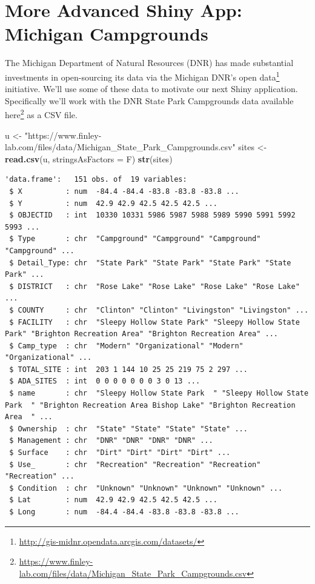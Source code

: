 \documentclass[
]{krantz}
\makeatletter
\newenvironment{Shaded}{\begin{snugshade}}{\end{snugshade}}
\newcommand{\DataTypeTok}[1]{\textcolor[rgb]{0.27,0.27,0.27}{#1}}
\newcommand{\KeywordTok}[1]{\textcolor[rgb]{0.27,0.27,0.27}{\textbf{#1}}}
\newcommand{\NormalTok}[1]{#1}
\newcommand{\StringTok}[1]{\textcolor[rgb]{0.5,0.5,0.5}{#1}}
\renewcommand{\href}[2]{#2\footnote{\url{#1}}}
\newenvironment{kframe}{%
\medskip{}
\setlength{\fboxsep}{.8em}
 \def\at@end@of@kframe{}%
 \ifinner\ifhmode%
  \def\at@end@of@kframe{\end{minipage}}%
  \begin{minipage}{\columnwidth}%
 \fi\fi%
 \def\FrameCommand##1{\hskip\@totalleftmargin \hskip-\fboxsep
 \colorbox{shadecolor}{##1}\hskip-\fboxsep
     \hskip-\linewidth \hskip-\@totalleftmargin \hskip\columnwidth}%
 \MakeFramed {\advance\hsize-\width
   \@totalleftmargin\z@ \linewidth\hsize
   \@setminipage}}%
 {\par\unskip\endMakeFramed%
 \at@end@of@kframe}
\renewenvironment{Shaded}{\begin{kframe}}{\end{kframe}}
\makeatother
\begin{document}
\hypertarget{more-advanced-shiny-app-michigan-campgrounds}{%
\section{More Advanced Shiny App: Michigan Campgrounds}\label{more-advanced-shiny-app-michigan-campgrounds}}

The Michigan Department of Natural Resources (DNR) has made substantial investments in open-sourcing its data via the \href{http://gis-midnr.opendata.arcgis.com/datasets/}{Michigan DNR's open data} initiative. We'll use some of these data to motivate our next Shiny application. Specifically we'll work with the DNR State Park Campgrounds data available \href{https://www.finley-lab.com/files/data/Michigan_State_Park_Campgrounds.csv}{here} as a CSV file.

\begin{Shaded}
\begin{Highlighting}[]
\NormalTok{u \textless{}{-}}\StringTok{ "https://www.finley{-}lab.com/files/data/Michigan\_State\_Park\_Campgrounds.csv"}
\NormalTok{sites \textless{}{-}}\StringTok{ }\KeywordTok{read.csv}\NormalTok{(u, }\DataTypeTok{stringsAsFactors =}\NormalTok{ F)}
\KeywordTok{str}\NormalTok{(sites)}
\end{Highlighting}
\end{Shaded}

\begin{verbatim}
'data.frame':	151 obs. of  19 variables:
 $ X          : num  -84.4 -84.4 -83.8 -83.8 -83.8 ...
 $ Y          : num  42.9 42.9 42.5 42.5 42.5 ...
 $ OBJECTID   : int  10330 10331 5986 5987 5988 5989 5990 5991 5992 5993 ...
 $ Type       : chr  "Campground" "Campground" "Campground" "Campground" ...
 $ Detail_Type: chr  "State Park" "State Park" "State Park" "State Park" ...
 $ DISTRICT   : chr  "Rose Lake" "Rose Lake" "Rose Lake" "Rose Lake" ...
 $ COUNTY     : chr  "Clinton" "Clinton" "Livingston" "Livingston" ...
 $ FACILITY   : chr  "Sleepy Hollow State Park" "Sleepy Hollow State Park" "Brighton Recreation Area" "Brighton Recreation Area" ...
 $ Camp_type  : chr  "Modern" "Organizational" "Modern" "Organizational" ...
 $ TOTAL_SITE : int  203 1 144 10 25 25 219 75 2 297 ...
 $ ADA_SITES  : int  0 0 0 0 0 0 0 3 0 13 ...
 $ name       : chr  "Sleepy Hollow State Park  " "Sleepy Hollow State Park  " "Brighton Recreation Area Bishop Lake" "Brighton Recreation Area  " ...
 $ Ownership  : chr  "State" "State" "State" "State" ...
 $ Management : chr  "DNR" "DNR" "DNR" "DNR" ...
 $ Surface    : chr  "Dirt" "Dirt" "Dirt" "Dirt" ...
 $ Use_       : chr  "Recreation" "Recreation" "Recreation" "Recreation" ...
 $ Condition  : chr  "Unknown" "Unknown" "Unknown" "Unknown" ...
 $ Lat        : num  42.9 42.9 42.5 42.5 42.5 ...
 $ Long       : num  -84.4 -84.4 -83.8 -83.8 -83.8 ...
\end{verbatim}
\end{document}
